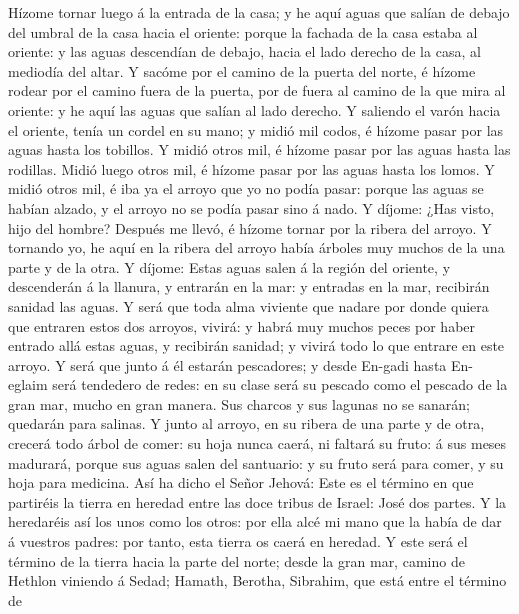  Hízome tornar luego á la entrada de la casa; y he aquí
aguas que salían de debajo del umbral de la casa hacia el oriente:
porque la fachada de la casa estaba al oriente: y las aguas descendían
de debajo, hacia el lado derecho de la casa, al mediodía del altar.
 Y sacóme por el camino de la puerta del norte, é hízome
rodear por el camino fuera de la puerta, por de fuera al camino de la
que mira al oriente: y he aquí las aguas que salían al lado derecho.
 Y saliendo el varón hacia el oriente, tenía un cordel en su
mano; y midió mil codos, é hízome pasar por las aguas hasta los
tobillos.  Y midió otros mil, é hízome pasar por las aguas
hasta las rodillas. Midió luego otros mil, é hízome pasar por las aguas
hasta los lomos.  Y midió otros mil, é iba ya el arroyo que
yo no podía pasar: porque las aguas se habían alzado, y el arroyo no se
podía pasar sino á nado.  Y díjome: ¿Has visto, hijo del
hombre? Después me llevó, é hízome tornar por la ribera del arroyo.
 Y tornando yo, he aquí en la ribera del arroyo había
árboles muy muchos de la una parte y de la otra.  Y díjome:
Estas aguas salen á la región del oriente, y descenderán á la llanura, y
entrarán en la mar: y entradas en la mar, recibirán sanidad las aguas.
 Y será que toda alma viviente que nadare por donde quiera
que entraren estos dos arroyos, vivirá: y habrá muy muchos peces por
haber entrado allá estas aguas, y recibirán sanidad; y vivirá todo lo
que entrare en este arroyo.  Y será que junto á él estarán
pescadores; y desde En-gadi hasta En-eglaim será tendedero de redes: en
su clase será su pescado como el pescado de la gran mar, mucho en gran
manera.  Sus charcos y sus lagunas no se sanarán; quedarán
para salinas.  Y junto al arroyo, en su ribera de una parte
y de otra, crecerá todo árbol de comer: su hoja nunca caerá, ni faltará
su fruto: á sus meses madurará, porque sus aguas salen del santuario: y
su fruto será para comer, y su hoja para medicina.  Así ha
dicho el Señor Jehová: Este es el término en que partiréis la tierra en
heredad entre las doce tribus de Israel: José dos partes. 
Y la heredaréis así los unos como los otros: por ella alcé mi mano que
la había de dar á vuestros padres: por tanto, esta tierra os caerá en
heredad.  Y este será el término de la tierra hacia la
parte del norte; desde la gran mar, camino de Hethlon viniendo á Sedad;
 Hamath, Berotha, Sibrahim, que está entre el término de
